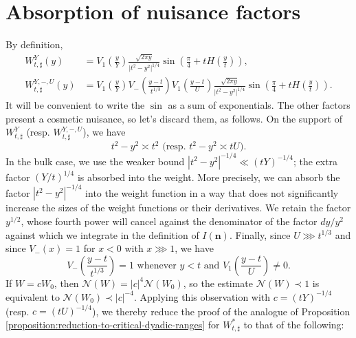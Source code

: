 \documentclass[reqno]{amsart} 
\begin{document}
\section{Absorption of nuisance factors}\label{sec:cqx50az7zk}
By definition,
\begin{align*}
  W _{t, \sharp}^Y(y) &= V_1\left(\frac{y}{Y}\right) \frac{\sqrt{2 \pi y}  }{ \lvert t^2 - y^2 \rvert ^{1/4}  }
                        \sin \left( \frac{\pi }{4} + t H \left( \frac{y}{t} \right) \right), \\
  W _{t, \sharp}^{Y,-,U}(y) &= V_1\left(\frac{y}{Y}\right)  V_{-} \left(\frac{y - t}{t ^{1/3} }\right)
  V_1 \left( \frac{y - t}{U} \right) \frac{\sqrt{2 \pi y}  }{ \lvert t^2 - y^2 \rvert ^{1/4}  }
                              \sin \left( \frac{\pi }{4} + t H \left( \frac{y}{t} \right) \right).
\end{align*}
It will be convenient to write the $\sin$ as a sum of exponentials.  The other factors present a cosmetic nuisance, so let's discard them, as follows.  On the support of $W_{t,\sharp}^Y$ (resp.  $W_{t,\sharp}^{Y,-,U}$), we have
\begin{equation*}
  \text{$t^2 - y^2 \asymp t^2$ (resp. $t^2 - y^2 \asymp t U$)}.
\end{equation*}
In the bulk case, we use the weaker bound $|t^2-y^2|^{-1/4} \ll (tY)^{-1/4}$; the extra factor $(Y/t)^{1/4}$ is absorbed into the weight.  More precisely, we can absorb the factor $|t^2 - y^2|^{-1/4}$ into the weight function in a way that does not significantly increase the sizes of the weight functions or their derivatives.  We retain the factor $y^{1/2}$, whose fourth power will cancel against the denominator of the factor $d y / y^2$ against which we integrate in the definition of $I(\mathbf{n})$.  Finally, since $U \ggg t ^{1/3}$ and since $V_-(x) = 1$ for $x < 0$ with $x \ggg 1$, we have
\begin{equation*}
  V_- \left( \frac{y-t}{t ^{1/3} } \right) = 1 \text{ whenever } y < t \text{ and } V_1 \left( \frac{y - t}{U} \right) \neq 0.
\end{equation*}
If $W = c W_0$, then $\mathcal{N}(W) = |c|^4 \mathcal{N}(W_0)$, so the estimate $\mathcal{N}(W) \prec 1$ is equivalent to $\mathcal{N}(W_0) \prec |c|^{-4}$.  Applying this observation with $c = (t Y)^{-1/4}$ (resp. $c = (t U)^{-1/4}$), we thereby reduce the proof of the analogue of Proposition \ref{proposition:reduction-to-critical-dyadic-ranges} for $W_{t,\sharp}^{*}$ to that of the following:
\end{document}
